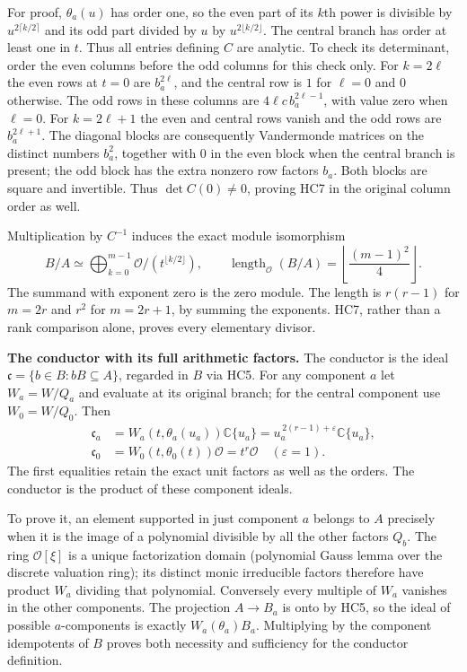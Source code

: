 \documentclass[11pt,a4paper]{article}
\theoremstyle{definition}\newtheorem{definition}[theorem]{Definition}
\begin{document}
For proof, $\theta_a(u)$ has order one, so the even part of its
$k$th power is divisible by $u^{2\lceil k/2\rceil}$ and its odd
part divided by $u$ by $u^{2\lfloor k/2\rfloor}$. The central
branch has order at least one in $t$. Thus all entries defining
$C$ are analytic. To check its determinant, order the even columns
before the odd columns for this check only. For $k=2\ell$ the even
rows at $t=0$ are $b_a^{2\ell}$, and the central row is $1$ for
$\ell=0$ and $0$ otherwise. The odd rows in these columns are
$4\ell c\,b_a^{2\ell-1}$, with value zero when $\ell=0$.
For $k=2\ell+1$ the even and central rows vanish and the odd
rows are $b_a^{2\ell+1}$. The diagonal blocks are consequently
Vandermonde matrices on the distinct numbers $b_a^2$, together
with $0$ in the even block when the central branch is present;
the odd block has the extra nonzero row factors $b_a$.
Both blocks are square and invertible. Thus $\det C(0)\ne0$,
proving HC7 in the original column order as well.

Multiplication by $C^{-1}$ induces the exact module isomorphism
\[
 \boxed{B/A\simeq
   \bigoplus_{k=0}^{m-1}\mathcal O/(t^{\lfloor k/2\rfloor}),
 \qquad
 \operatorname{length}_{\mathcal O}(B/A)
       =\left\lfloor\frac{(m-1)^2}{4}\right\rfloor.}
 \tag{HC8}
\]
The summand with exponent zero is the zero module. The length is
$r(r-1)$ for $m=2r$ and $r^2$ for $m=2r+1$, by summing the
exponents. HC7, rather than a rank comparison alone, proves every
elementary divisor.

\HC\textbf{The conductor with its full arithmetic factors.}
The conductor is the ideal
$\mathfrak c=\{b\in B:bB\subseteq A\}$, regarded in $B$ via HC5.
For any component $a$ let $W_a=W/Q_a$ and evaluate at its original
branch; for the central component use $W_0=W/Q_0$. Then
\[
 \begin{split}
 \mathfrak c_a&=W_a(t,\theta_a(u_a))\mathbb C\{u_a\}
            =u_a^{\,2(r-1)+\varepsilon}\mathbb C\{u_a\},\\
 \mathfrak c_0&=W_0(t,\theta_0(t))\mathcal O
            =t^r\mathcal O\quad(\varepsilon=1).
 \end{split}
 \tag{HC9}
\]
The first equalities retain the exact unit factors as well as the
orders. The conductor is the product of these component ideals.

To prove it, an element supported in just component $a$ belongs to
$A$ precisely when it is the image of a polynomial divisible by
all the other factors $Q_b$. The ring $\mathcal O[\xi]$ is a
unique factorization domain (polynomial Gauss lemma over the discrete
valuation ring); its distinct monic irreducible factors therefore
have product $W_a$ dividing that polynomial. Conversely every
multiple of $W_a$ vanishes in the other components. The projection
$A\to B_a$ is onto by HC5, so the ideal of possible $a$-components
is exactly $W_a(\theta_a)B_a$. Multiplying by the component
idempotents of $B$ proves both necessity and sufficiency for the
conductor definition.
\end{document}
